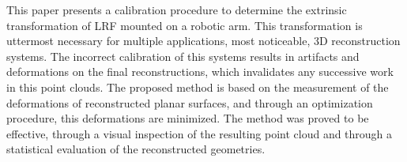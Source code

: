 \documentclass[conference]{IEEEtran}
\begin{document}
This paper presents a calibration procedure to determine the extrinsic transformation of LRF mounted on a robotic arm. This transformation is uttermost necessary for multiple applications, most noticeable, 3D reconstruction systems. The incorrect calibration of this systems results in artifacts and deformations on the final reconstructions, which invalidates any successive work in this point clouds. The proposed method is based on the measurement of the deformations of reconstructed planar surfaces, and through an optimization procedure, this deformations are minimized. The method was proved to be effective, through a visual inspection of the resulting point cloud and through a statistical evaluation of the reconstructed geometries.



\end{document}

